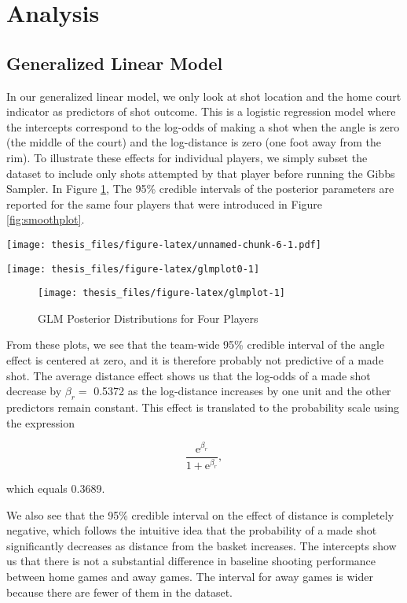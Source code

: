 \documentclass[12pt,twoside]{dukestatscithesis}
\theoremstyle{definition}
\theoremstyle{definition}
\theoremstyle{definition}
\theoremstyle{remark}
\begin{document}
\section{Analysis}\label{analysis}

\subsection{Generalized Linear Model}\label{generalized-linear-model-1}

In our generalized linear model, we only look at shot location and the
home court indicator as predictors of shot outcome. This is a logistic
regression model where the intercepts correspond to the log-odds of
making a shot when the angle is zero (the middle of the court) and the
log-distance is zero (one foot away from the rim). To illustrate these
effects for individual players, we simply subset the dataset to include
only shots attempted by that player before running the Gibbs Sampler. In
Figure \ref{fig:glmplot}, The 95\% credible intervals of the posterior
parameters are reported for the same four players that were introduced
in Figure \ref{fig:smoothplot}.

\texttt{[image: thesis\_files/figure-latex/unnamed-chunk-6-1.pdf]}
\begin{center}\texttt{[image: thesis\_files/figure-latex/glmplot0-1]} \end{center}
\begin{figure}

{\centering \texttt{[image: thesis\_files/figure-latex/glmplot-1]} 

}

\caption{GLM Posterior Distributions for Four Players}\label{fig:glmplot}
\end{figure}
From these plots, we see that the team-wide 95\% credible interval of
the angle effect is centered at zero, and it is therefore probably not
predictive of a made shot. The average distance effect shows us that the
log-odds of a made shot decrease by \(\beta_r =\) 0.5372 as the
log-distance increases by one unit and the other predictors remain
constant. This effect is translated to the probability scale using the
expression

\[
\frac{\text{e}^{\beta_r}}{1 + \text{e}^{\beta_r}},
\]

which equals 0.3689.

We also see that the 95\% credible interval on the effect of distance is
completely negative, which follows the intuitive idea that the
probability of a made shot significantly decreases as distance from the
basket increases. The intercepts show us that there is not a substantial
difference in baseline shooting performance between home games and away
games. The interval for away games is wider because there are fewer of
them in the dataset.
\end{document}
